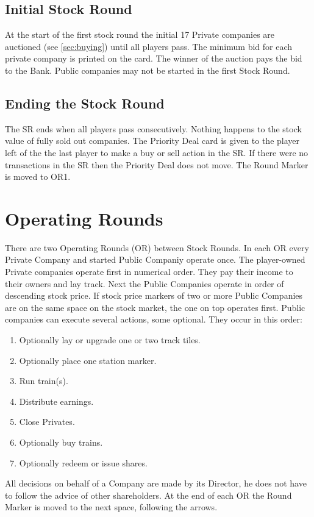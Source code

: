 \documentclass[a4paper,twocolumn]{article}
\begin{document}
\subsection{Initial Stock Round}
At the start of the first stock round the initial 17 Private companies are
auctioned (see \autoref{sec:buying}) until all players pass. The minimum bid for
each private company is printed on the card. The winner of the auction pays the
bid to the Bank. Public companies may not be started in the first Stock Round.

\subsection{Ending the Stock Round}
The SR ends when all players pass consecutively. Nothing happens to the stock
value of fully sold out companies. The Priority Deal card is given to the player
left of the the last player to make a buy or sell action in the SR. If there
were no transactions in the SR then the Priority Deal does not move. The Round
Marker is moved to OR1.

\section{Operating Rounds}
There are two Operating Rounds (OR) between Stock Rounds. In each OR every
Private Company and started Public Companiy operate once. The player-owned
Private companies operate first in numerical order. They pay their income to
their owners and lay track. Next the Public Companies operate in order of
descending stock price. If stock price markers of two or more Public Companies
are on the same space on the stock market, the one on top operates first. Public
companies can execute several actions, some optional. They occur in this order:
\begin{enumerate}
	\item Optionally lay or upgrade one or two track tiles.
	\item Optionally place one station marker.
	\item Run train(s).
	\item Distribute earnings.
	\item Close Privates.
	\item Optionally buy trains.
	\item Optionally redeem or issue shares.
\end{enumerate}
All decisions on behalf of a Company are made by its Director, he does not have
to follow the advice of other shareholders. At the end of each OR the Round
Marker is moved to the next space, following the arrows.
\end{document}

